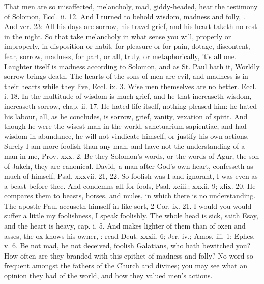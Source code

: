 {That men are so misaffected, melancholy, mad, giddy-headed, hear the
testimony of Solomon, Eccl. ii. 12. And I turned to behold wisdom,
madness and folly, \etc. And ver. 23: All his days are sorrow, his travel
grief, and his heart taketh no rest in the night. So that take
melancholy in what sense you will, properly or improperly, in
disposition or habit, for pleasure or for pain, dotage, discontent,
fear, sorrow, madness, for part, or all, truly, or metaphorically, 'tis
all one. Laughter itself is madness according to Solomon, and as St.
Paul hath it, Worldly sorrow brings death. The hearts of the sons of
men are evil, and madness is in their hearts while they live, Eccl. ix.
3. Wise men themselves are no better. Eccl. i. 18. In the multitude of
wisdom is much grief, and he that increaseth wisdom, increaseth sorrow,
chap. ii. 17. He hated life itself, nothing pleased him: he hated his
labour, all, as he concludes, is sorrow, grief, vanity, vexation
of spirit. And though he were the wisest man in the world, sanctuarium
sapientiae, and had wisdom in abundance, he will not vindicate himself,
or justify his own actions. Surely I am more foolish than any man, and
have not the understanding of a man in me, Prov. xxx. 2. Be they
Solomon's words, or the words of Agur, the son of Jakeh, they are
canonical. David, a man after God's own heart, confesseth as much of
himself, Psal. xxxvii. 21, 22. So foolish was I and ignorant, I was
even as a beast before thee. And condemns all for fools, Psal. xciii.;
xxxii. 9; xlix. 20. He compares them to beasts, horses, and mules, in
which there is no understanding. The apostle Paul accuseth himself in
like sort, 2 Cor. ix. 21. I would you would suffer a little my
foolishness, I speak foolishly. The whole head is sick, saith Esay, and
the heart is heavy, cap. i. 5. And makes lighter of them than of oxen
and asses, the ox knows his owner, \etc: read Deut. xxxii. 6; Jer. iv.;
Amos, iii. 1; Ephes. v. 6. Be not mad, be not deceived, foolish
Galatians, who hath bewitched you? How often are they branded with this
epithet of madness and folly? No word so frequent amongst the fathers
of the Church and divines; you may see what an opinion they had of the
world, and how they valued men's actions.

}
